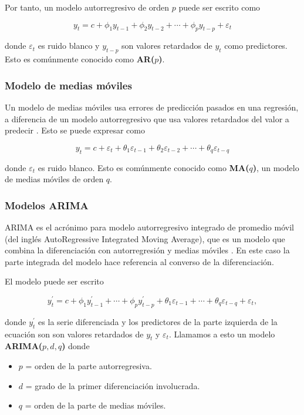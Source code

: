 Por tanto, un modelo autorregresivo de orden $p$ puede ser escrito como 

\[ y_{t}=c+\phi_{1} y_{t-1}+\phi_{2} y_{t-2}+\cdots+\phi_{p} y_{t-p}+\varepsilon_{t} \]

donde $\varepsilon_{t}$ es ruido blanco y $y_{t-p}$ son valores retardados de $y_t$ como predictores. Esto es comúnmente conocido como \textbf{AR($p$)}.

\subsubsection{Modelo de medias móviles}

Un modelo de medias móviles usa errores de predicción pasados en una regresión, a diferencia de un modelo autorregresivo que usa valores retardados del valor a predecir \parencite{hyndmanForecastingPrinciplesPractice2018}. Esto se puede expresar como

\[ y_{t}=c+\varepsilon_{t}+\theta_{1} \varepsilon_{t-1}+\theta_{2} \varepsilon_{t-2}+\cdots+\theta_{q} \varepsilon_{t-q} \]

donde $\varepsilon_{t}$ es ruido blanco. Esto es comúnmente conocido como \textbf{MA($q$)}, un modelo de medias móviles de orden $q$.

\subsubsection{Modelos ARIMA}

ARIMA es el acrónimo para modelo autorregresivo integrado de promedio móvil (del inglés AutoRegressive Integrated Moving Average), que es un modelo que combina la diferenciación con autorregresión y medias móviles \parencite{hyndmanForecastingPrinciplesPractice2018}. En este caso la parte integrada del modelo hace referencia al converso de la diferenciación. 

El modelo puede ser escrito 

\[ y_{t}^{\prime}=c+\phi_{1} y_{t-1}^{\prime}+\cdots+\phi_{p} y_{t-p}^{\prime}+\theta_{1} \varepsilon_{t-1}+\cdots+\theta_{q} \varepsilon_{t-q}+\varepsilon_{t}, \]

donde $y_{t}^{\prime}$ es la serie diferenciada y los predictores de la parte izquierda de la ecuación son son valores retardados de $y_t$ y $\varepsilon_t$. Llamamos a esto un modelo \textbf{ARIMA($p,d,q$)} donde

\begin{itemize}
\item $p$ = orden de la parte autorregresiva.
\item $d$ = grado de la primer diferenciación involucrada.
\item $q$ = orden de la parte de medias móviles.
\end{itemize}

